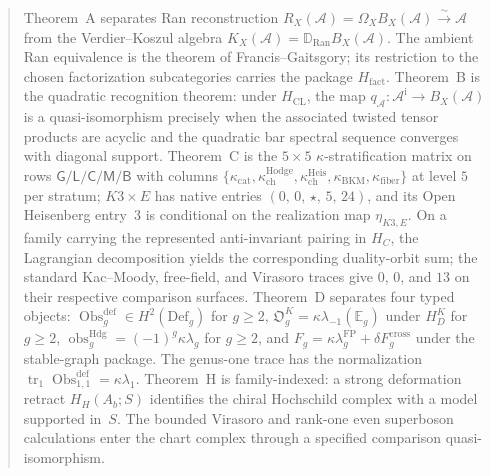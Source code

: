 \documentclass[11pt]{article}
\theoremstyle{plain}
\theoremstyle{definition}
\theoremstyle{remark}
\newcommand{\Ran}{\mathrm{Ran}}
\newcommand{\cA}{\mathcal{A}}
\begin{document}
\begin{abstract}
Theorem~A separates Ran reconstruction
$R_X(\cA)=\Omega_XB_X(\cA)\xrightarrow{\sim}\cA$ from the
Verdier--Koszul algebra
$K_X(\cA)=\mathbb D_{\Ran}B_X(\cA)$.  The ambient Ran equivalence is
the theorem of Francis--Gaitsgory; its restriction to the chosen
factorization subcategories carries the package $H_{\mathrm{fact}}$.
Theorem~B is the quadratic recognition theorem: under
$H_{\mathrm{CL}}$, the map
$q_\cA\colon\cA^{\mathrm i}\to B_X(\cA)$ is a quasi-isomorphism
precisely when the associated twisted tensor products are acyclic
and the quadratic bar spectral sequence converges with diagonal
support.
Theorem~C is the $5 \times 5$ $\kappa$-stratification matrix
on rows $\mathsf{G/L/C/M/B}$ with columns
$\{\kappa_{\mathrm{cat}},
\kappa^{\mathrm{Hodge}}_{\mathrm{ch}},
\kappa^{\mathrm{Heis}}_{\mathrm{ch}},
\kappa_{\mathrm{BKM}},
\kappa_{\mathrm{fiber}}\}$ at level $5$ per stratum;
$K3 \times E$ has native entries $(0,\,0,\,\star,\,5,\,24)$, and its
Open Heisenberg entry~$3$ is conditional on the realization map
\(\eta_{K3,E}\).  On a family carrying the represented
anti-invariant pairing in $H_C$, the Lagrangian decomposition yields
the corresponding duality-orbit sum; the standard Kac--Moody,
free-field, and Virasoro traces give $0$, $0$, and $13$ on their
respective comparison surfaces.
Theorem~D separates four typed objects:
$\operatorname{Obs}^{\mathrm{def}}_g\in H^2(\mathrm{Def}_g)$ for
$g\ge2$,
$\mathfrak O_g^K=\kappa\lambda_{-1}(\mathbb E_g)$ under $H_D^K$ for
$g\ge2$,
$\operatorname{obs}^{\mathrm{Hdg}}_g=(-1)^g\kappa\lambda_g$ for
$g\ge2$, and
$F_g=\kappa\lambda_g^{\mathrm{FP}}+\delta F_g^{\mathrm{cross}}$
under the stable-graph package.  The genus-one trace has the
normalization
$\operatorname{tr}_1\operatorname{Obs}^{\mathrm{def}}_{1,1}
=\kappa\lambda_1$.
Theorem~H is family-indexed: a strong deformation retract
$H_H(A_b;S)$ identifies the chiral Hochschild complex with a model
supported in~$S$.  The bounded Virasoro and rank-one even superboson
calculations enter the chart complex through a specified comparison
quasi-isomorphism.


\end{abstract}
\end{document}
